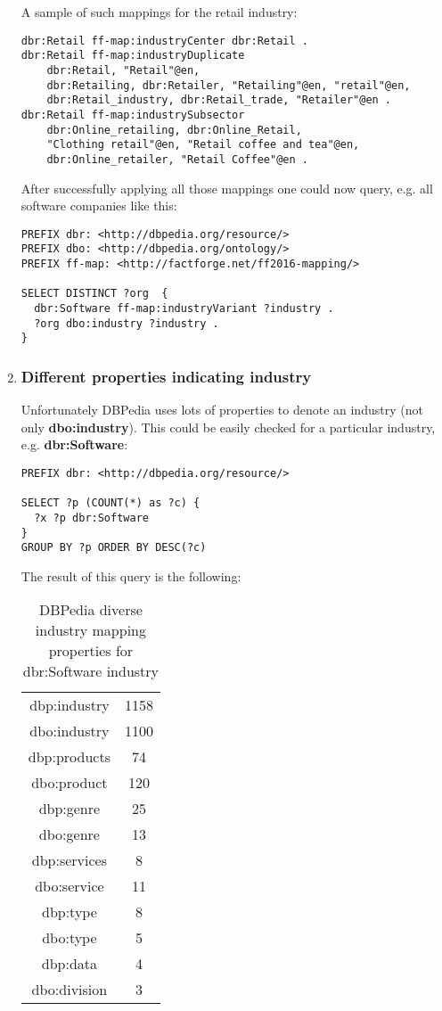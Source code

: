 \begin{enumerate}
    A sample of such mappings for the retail industry:
\begin{verbatim}
dbr:Retail ff-map:industryCenter dbr:Retail .
dbr:Retail ff-map:industryDuplicate 
    dbr:Retail, "Retail"@en, 
    dbr:Retailing, dbr:Retailer, "Retailing"@en, "retail"@en, 
    dbr:Retail_industry, dbr:Retail_trade, "Retailer"@en .
dbr:Retail ff-map:industrySubsector 
    dbr:Online_retailing, dbr:Online_Retail, 
    "Clothing retail"@en, "Retail coffee and tea"@en, 
    dbr:Online_retailer, "Retail Coffee"@en .
\end{verbatim}
    
    After successfully applying all those mappings one could now query, e.g. all software companies like this:
    
\begin{verbatim}
PREFIX dbr: <http://dbpedia.org/resource/>
PREFIX dbo: <http://dbpedia.org/ontology/>
PREFIX ff-map: <http://factforge.net/ff2016-mapping/>

SELECT DISTINCT ?org  {
  dbr:Software ff-map:industryVariant ?industry .
  ?org dbo:industry ?industry .
}
\end{verbatim}

    \item \subsubsection{Different properties indicating industry}
    
    Unfortunately DBPedia uses lots of properties to denote an industry (not only \textbf{dbo:industry}).
    This could be easily checked for a particular industry, e.g. \textbf{dbr:Software}:
    
\begin{verbatim}
PREFIX dbr: <http://dbpedia.org/resource/>

SELECT ?p (COUNT(*) as ?c) {
  ?x ?p dbr:Software
} 
GROUP BY ?p ORDER BY DESC(?c)    
\end{verbatim}
    The result of this query is the following:

\begin{table}[h!]
\centering
\begin{tabular}{||c|c||} 
\hline
dbp:industry & 1158 \\
dbo:industry & 1100 \\
dbp:products & 74 \\
dbo:product	& 120 \\
dbp:genre & 25 \\
dbo:genre & 13 \\
dbp:services & 8 \\
dbo:service	& 11 \\
dbp:type & 8 \\
dbo:type & 5 \\
dbp:data & 4 \\
dbo:division & 3 \\ [1ex]
\hline
\end{tabular}
\caption{DBPedia diverse industry mapping properties for dbr:Software industry}
\label{table:1}
\end{table}


\end{enumerate}
